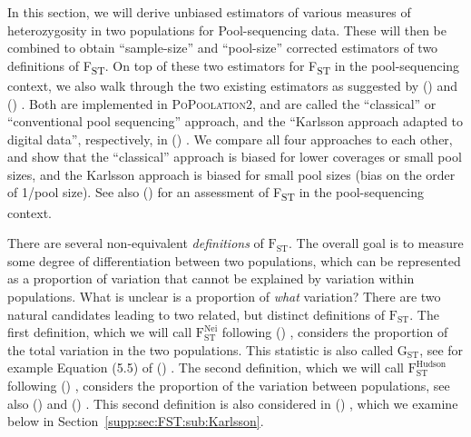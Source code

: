 \documentclass[letterpaper,fontsize=9pt,DIV=12]{scrartcl}
\newcommand\citeay[1]{\citeauthor{#1} (\citeyear{#1}) \cite{#1}}
\newcommand\toolname{\textsc}
\newcommand\secref[1]{Section~\ref{#1}}
\newcommand{\fst}{F\textsubscript{ST}}
\begin{document}
In this section, we will derive unbiased estimators of various measures of heterozygosity in two populations for Pool-sequencing data.
These will then be combined to obtain ``sample-size'' and ``pool-size'' corrected estimators of two definitions of \fst.
On top of these two estimators for \fst{} in the pool-sequencing context, we also walk through the two existing estimators as suggested by \citeay{Kofler2011b} and \citeay{Karlsson2007}.
Both are implemented in \toolname{PoPoolation2}, and are called the ``classical'' or ``conventional pool sequencing'' approach, and the ``Karlsson approach adapted to digital data'', respectively, in \citeay{Kofler2011b}.
We compare all four approaches to each other, and show that the ``classical'' approach is biased for lower coverages or small pool sizes, and the Karlsson approach is biased for small pool sizes (bias on the order of 1/pool size).
See also \citeay{Hivert2018} for an assessment of \fst{} in the pool-sequencing context.


\label{supp:sec:FST:sub:Definition}

There are several non-equivalent \emph{definitions} of $\text{F}_\text{ST}$.
The overall goal is to measure some degree of differentiation between two populations, which can be represented as a proportion of variation that cannot be explained by variation within populations.
What is unclear is a proportion of \emph{what} variation?
There are two natural candidates leading to two related, but distinct definitions of $\text{F}_\text{ST}$.
The first definition, which we will call $\text{F}_\text{ST}^\text{Nei}$ following \citeay{Nei1973}, considers the proportion of the total variation in the two populations.
This statistic is also called $\text{G}_\text{ST}$, see for example Equation (5.5) of \citeay{Hahn2018}.
The second definition, which we will call $\text{F}_\text{ST}^\text{Hudson}$ following \citeay{Hudson1992}, considers the proportion of the variation between populations, see also \citeay{Cockerham1969} and \citeay{Weir2002}.
This second definition is also considered in \citeay{Karlsson2007}, which we examine below in \secref{supp:sec:FST:sub:Karlsson}.
\end{document}
